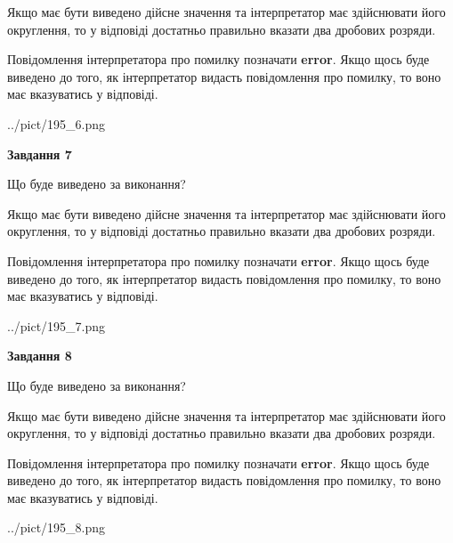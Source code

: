 \documentclass[12pt, ukrainian]{article}
\begin{document}
{\begin {Large}
Якщо має бути виведено дійсне значення та інтерпретатор має здійснювати його округлення, 
то у відповіді достатньо правильно вказати два дробових розряди.

Повідомлення інтерпретатора про помилку позначати \textbf{error}.
Якщо щось буде виведено до того, як інтерпретатор видасть повідомлення про помилку, 
то воно має вказуватись у відповіді. \par

\begin{center}
	{../pict/195_6.png}
\end{center}
\newpage

{\begin {center}\textbf{Завдання 7}\end {center}}\par
Що буде виведено за виконання? \par

Якщо має бути виведено дійсне значення та інтерпретатор має здійснювати його округлення, 
то у відповіді достатньо правильно вказати два дробових розряди.

Повідомлення інтерпретатора про помилку позначати \textbf{error}.
Якщо щось буде виведено до того, як інтерпретатор видасть повідомлення про помилку, 
то воно має вказуватись у відповіді. \par

\begin{center}
	{../pict/195_7.png}
\end{center}
\newpage

{\begin {center}\textbf{Завдання 8}\end {center}}\par
Що буде виведено за виконання? \par

Якщо має бути виведено дійсне значення та інтерпретатор має здійснювати його округлення, 
то у відповіді достатньо правильно вказати два дробових розряди.

Повідомлення інтерпретатора про помилку позначати \textbf{error}.
Якщо щось буде виведено до того, як інтерпретатор видасть повідомлення про помилку, 
то воно має вказуватись у відповіді. \par

\begin{center}
	{../pict/195_8.png}
\end{center}
\newpage


\end{Large}}
\end{document}
